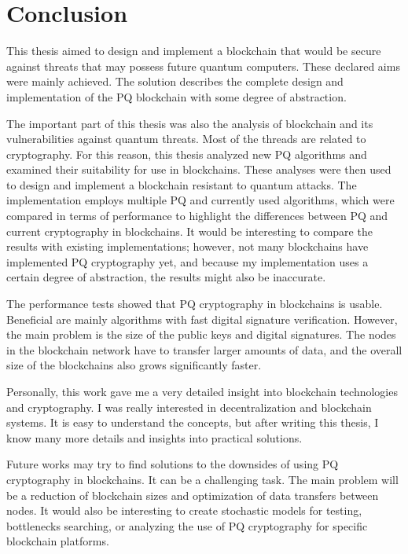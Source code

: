 
\chapter{Conclusion}
\label{Conclusion}

This thesis aimed to design and implement a blockchain that would be secure against threats that may possess future quantum computers. These declared aims were mainly achieved. The solution describes the complete design and implementation of the PQ blockchain with some degree of abstraction.

The important part of this thesis was also the analysis of blockchain and its vulnerabilities against quantum threats. Most of the threads are related to cryptography. For this reason, this thesis analyzed new PQ algorithms and examined their suitability for use in blockchains. These analyses were then used to design and implement a blockchain resistant to quantum attacks. The implementation employs multiple PQ and currently used algorithms, which were compared in terms of performance to highlight the differences between PQ and current cryptography in blockchains. It would be interesting to compare the results with existing implementations; however, not many blockchains have implemented PQ cryptography yet, and because my implementation uses a certain degree of abstraction, the results might also be inaccurate.

The performance tests showed that PQ cryptography in blockchains is usable. Beneficial are mainly algorithms with fast digital signature verification. However, the main problem is the size of the public keys and digital signatures. The nodes in the blockchain network have to transfer larger amounts of data, and the overall size of the blockchains also grows significantly faster.

Personally, this work gave me a very detailed insight into blockchain technologies and cryptography. I was really interested in decentralization and blockchain systems. It is easy to understand the concepts, but after writing this thesis, I know many more details and insights into practical solutions.

Future works may try to find solutions to the downsides of using PQ cryptography in blockchains. It can be a challenging task. The main problem will be a reduction of blockchain sizes and optimization of data transfers between nodes. It would also be interesting to create stochastic models for testing, bottlenecks searching, or analyzing the use of PQ cryptography for specific blockchain platforms.


% 